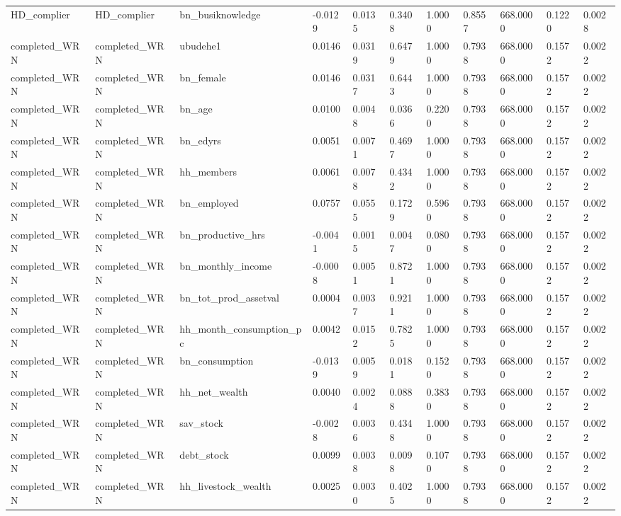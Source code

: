 \begin{tabular}{lllllllllll}
HD\_complier & HD\_complier & bn\_busiknowledge & -0.0129 & 0.0135 & 0.3408 & 1.0000 & 0.8557 & 668.0000 & 0.1220 & 0.0028 \\
completed\_WRN & completed\_WRN & ubudehe1 & 0.0146 & 0.0319 & 0.6479 & 1.0000 & 0.7938 & 668.0000 & 0.1572 & 0.0022 \\
completed\_WRN & completed\_WRN & bn\_female & 0.0146 & 0.0317 & 0.6443 & 1.0000 & 0.7938 & 668.0000 & 0.1572 & 0.0022 \\
completed\_WRN & completed\_WRN & bn\_age & 0.0100 & 0.0048 & 0.0366 & 0.2200 & 0.7938 & 668.0000 & 0.1572 & 0.0022 \\
completed\_WRN & completed\_WRN & bn\_edyrs & 0.0051 & 0.0071 & 0.4697 & 1.0000 & 0.7938 & 668.0000 & 0.1572 & 0.0022 \\
completed\_WRN & completed\_WRN & hh\_members & 0.0061 & 0.0078 & 0.4342 & 1.0000 & 0.7938 & 668.0000 & 0.1572 & 0.0022 \\
completed\_WRN & completed\_WRN & bn\_employed & 0.0757 & 0.0555 & 0.1729 & 0.5960 & 0.7938 & 668.0000 & 0.1572 & 0.0022 \\
completed\_WRN & completed\_WRN & bn\_productive\_hrs & -0.0041 & 0.0015 & 0.0047 & 0.0800 & 0.7938 & 668.0000 & 0.1572 & 0.0022 \\
completed\_WRN & completed\_WRN & bn\_monthly\_income & -0.0008 & 0.0051 & 0.8721 & 1.0000 & 0.7938 & 668.0000 & 0.1572 & 0.0022 \\
completed\_WRN & completed\_WRN & bn\_tot\_prod\_assetval & 0.0004 & 0.0037 & 0.9211 & 1.0000 & 0.7938 & 668.0000 & 0.1572 & 0.0022 \\
completed\_WRN & completed\_WRN & hh\_month\_consumption\_pc & 0.0042 & 0.0152 & 0.7825 & 1.0000 & 0.7938 & 668.0000 & 0.1572 & 0.0022 \\
completed\_WRN & completed\_WRN & bn\_consumption & -0.0139 & 0.0059 & 0.0181 & 0.1520 & 0.7938 & 668.0000 & 0.1572 & 0.0022 \\
completed\_WRN & completed\_WRN & hh\_net\_wealth & 0.0040 & 0.0024 & 0.0888 & 0.3830 & 0.7938 & 668.0000 & 0.1572 & 0.0022 \\
completed\_WRN & completed\_WRN & sav\_stock & -0.0028 & 0.0036 & 0.4348 & 1.0000 & 0.7938 & 668.0000 & 0.1572 & 0.0022 \\
completed\_WRN & completed\_WRN & debt\_stock & 0.0099 & 0.0038 & 0.0098 & 0.1070 & 0.7938 & 668.0000 & 0.1572 & 0.0022 \\
completed\_WRN & completed\_WRN & hh\_livestock\_wealth & 0.0025 & 0.0030 & 0.4025 & 1.0000 & 0.7938 & 668.0000 & 0.1572 & 0.0022 \\

\end{tabular}
